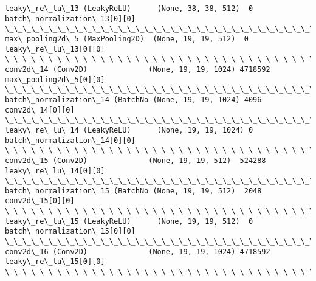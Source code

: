 \documentclass[11pt]{article}
\begin{document}
\begin{Verbatim}[commandchars=\\\{\}]
leaky\_re\_lu\_13 (LeakyReLU)      (None, 38, 38, 512)  0           batch\_normalization\_13[0][0]     
\_\_\_\_\_\_\_\_\_\_\_\_\_\_\_\_\_\_\_\_\_\_\_\_\_\_\_\_\_\_\_\_\_\_\_\_\_\_\_\_\_\_\_\_\_\_\_\_\_\_\_\_\_\_\_\_\_\_\_\_\_\_\_\_\_\_\_\_\_\_\_\_\_\_\_\_\_\_\_\_\_\_\_\_\_\_\_\_\_\_\_\_\_\_\_\_\_\_
max\_pooling2d\_5 (MaxPooling2D)  (None, 19, 19, 512)  0           leaky\_re\_lu\_13[0][0]             
\_\_\_\_\_\_\_\_\_\_\_\_\_\_\_\_\_\_\_\_\_\_\_\_\_\_\_\_\_\_\_\_\_\_\_\_\_\_\_\_\_\_\_\_\_\_\_\_\_\_\_\_\_\_\_\_\_\_\_\_\_\_\_\_\_\_\_\_\_\_\_\_\_\_\_\_\_\_\_\_\_\_\_\_\_\_\_\_\_\_\_\_\_\_\_\_\_\_
conv2d\_14 (Conv2D)              (None, 19, 19, 1024) 4718592     max\_pooling2d\_5[0][0]            
\_\_\_\_\_\_\_\_\_\_\_\_\_\_\_\_\_\_\_\_\_\_\_\_\_\_\_\_\_\_\_\_\_\_\_\_\_\_\_\_\_\_\_\_\_\_\_\_\_\_\_\_\_\_\_\_\_\_\_\_\_\_\_\_\_\_\_\_\_\_\_\_\_\_\_\_\_\_\_\_\_\_\_\_\_\_\_\_\_\_\_\_\_\_\_\_\_\_
batch\_normalization\_14 (BatchNo (None, 19, 19, 1024) 4096        conv2d\_14[0][0]                  
\_\_\_\_\_\_\_\_\_\_\_\_\_\_\_\_\_\_\_\_\_\_\_\_\_\_\_\_\_\_\_\_\_\_\_\_\_\_\_\_\_\_\_\_\_\_\_\_\_\_\_\_\_\_\_\_\_\_\_\_\_\_\_\_\_\_\_\_\_\_\_\_\_\_\_\_\_\_\_\_\_\_\_\_\_\_\_\_\_\_\_\_\_\_\_\_\_\_
leaky\_re\_lu\_14 (LeakyReLU)      (None, 19, 19, 1024) 0           batch\_normalization\_14[0][0]     
\_\_\_\_\_\_\_\_\_\_\_\_\_\_\_\_\_\_\_\_\_\_\_\_\_\_\_\_\_\_\_\_\_\_\_\_\_\_\_\_\_\_\_\_\_\_\_\_\_\_\_\_\_\_\_\_\_\_\_\_\_\_\_\_\_\_\_\_\_\_\_\_\_\_\_\_\_\_\_\_\_\_\_\_\_\_\_\_\_\_\_\_\_\_\_\_\_\_
conv2d\_15 (Conv2D)              (None, 19, 19, 512)  524288      leaky\_re\_lu\_14[0][0]             
\_\_\_\_\_\_\_\_\_\_\_\_\_\_\_\_\_\_\_\_\_\_\_\_\_\_\_\_\_\_\_\_\_\_\_\_\_\_\_\_\_\_\_\_\_\_\_\_\_\_\_\_\_\_\_\_\_\_\_\_\_\_\_\_\_\_\_\_\_\_\_\_\_\_\_\_\_\_\_\_\_\_\_\_\_\_\_\_\_\_\_\_\_\_\_\_\_\_
batch\_normalization\_15 (BatchNo (None, 19, 19, 512)  2048        conv2d\_15[0][0]                  
\_\_\_\_\_\_\_\_\_\_\_\_\_\_\_\_\_\_\_\_\_\_\_\_\_\_\_\_\_\_\_\_\_\_\_\_\_\_\_\_\_\_\_\_\_\_\_\_\_\_\_\_\_\_\_\_\_\_\_\_\_\_\_\_\_\_\_\_\_\_\_\_\_\_\_\_\_\_\_\_\_\_\_\_\_\_\_\_\_\_\_\_\_\_\_\_\_\_
leaky\_re\_lu\_15 (LeakyReLU)      (None, 19, 19, 512)  0           batch\_normalization\_15[0][0]     
\_\_\_\_\_\_\_\_\_\_\_\_\_\_\_\_\_\_\_\_\_\_\_\_\_\_\_\_\_\_\_\_\_\_\_\_\_\_\_\_\_\_\_\_\_\_\_\_\_\_\_\_\_\_\_\_\_\_\_\_\_\_\_\_\_\_\_\_\_\_\_\_\_\_\_\_\_\_\_\_\_\_\_\_\_\_\_\_\_\_\_\_\_\_\_\_\_\_
conv2d\_16 (Conv2D)              (None, 19, 19, 1024) 4718592     leaky\_re\_lu\_15[0][0]             
\_\_\_\_\_\_\_\_\_\_\_\_\_\_\_\_\_\_\_\_\_\_\_\_\_\_\_\_\_\_\_\_\_\_\_\_\_\_\_\_\_\_\_\_\_\_\_\_\_\_\_\_\_\_\_\_\_\_\_\_\_\_\_\_\_\_\_\_\_\_\_\_\_\_\_\_\_\_\_\_\_\_\_\_\_\_\_\_\_\_\_\_\_\_\_\_\_\_

\end{Verbatim}
\end{document}
